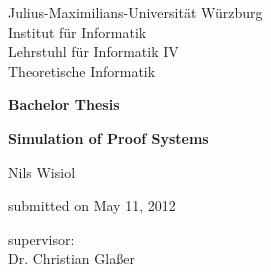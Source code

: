 \begin{titlepage}
  Julius-Maximilians-Universität Würzburg\\
  Institut für Informatik\\
  Lehrstuhl für Informatik IV\\
  Theoretische Informatik
  
  \vspace{3cm}
  
  \begin{center}
   \LARGE\textbf{Bachelor Thesis}
  \end{center}
  
  \vspace{0cm}
  
  \begin{center}
   \huge\textbf{Simulation of Proof Systems}
  \end{center}
  
  \vspace{1cm}
  
  \begin{center}
   \Large Nils Wisiol
  \end{center}
  
  \vspace{0cm}
  
  \begin{center}
   \Large submitted on May 11, 2012
  \end{center}
  
  \vspace{5cm}
  
  \begin{center}
   \Large supervisor:\\Dr. Christian Glaßer
  \end{center}
  
  
\end{titlepage}
